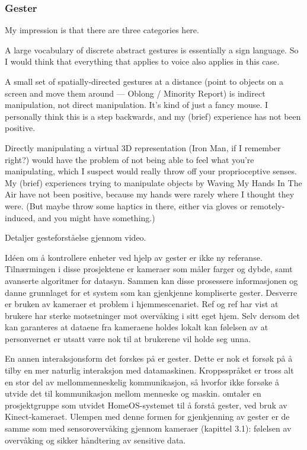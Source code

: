\subsubsection*{Gester}
{\color{blue}
My impression is that there are three categories here.

A large vocabulary of discrete abstract gestures is essentially a sign language. So I would think that everything that applies to voice also applies in this case.

A small set of spatially-directed gestures at a distance (point to objects on a screen and move them around — Oblong / Minority Report) is indirect manipulation, not direct manipulation. It's kind of just a fancy mouse. I personally think this is a step backwards, and my (brief) experience has not been positive.

Directly manipulating a virtual 3D representation (Iron Man, if I remember right?) would have the problem of not being able to feel what you're manipulating, which I suspect would really throw off your proprioceptive senses. My (brief) experiences trying to manipulate objects by Waving My Hands In The Air have not been positive, because my hands were rarely where I thought they were. (But maybe throw some haptics in there, either via gloves or remotely-induced, and you might have something.)

Detaljer gesteforståelse gjennom video.

Idéen om å kontrollere enheter ved hjelp av gester er ikke ny {\color{red} referanse}. Tilnærmingen i disse prosjektene er kameraer som måler farger og dybde, samt avanserte algoritmer for datasyn. Sammen kan disse prosessere informasjonen og danne grunnlaget for et system som kan gjenkjenne kompliserte gester. Desverre er bruken av kameraer et problem i hjemmescenariet. {\color{red} Ref og ref} har vist at brukere har sterke motsetninger mot overvåking i sitt eget hjem. Selv dersom det kan garanteres at dataene fra kameraene holdes lokalt kan følelsen av at personvernet er utsatt være nok til at brukerene vil holde seg unna. 

En annen interaksjonsform det forskes på er gester. Dette er nok et forsøk på å tilby en mer naturlig interaksjon med datamaskinen. Kroppsspråket er tross alt en stor del av mellommenneskelig kommunikasjon, så hvorfor ikke forsøke å utvide det til kommunikasjon mellom menneske og maskin. \citet{homeos} omtaler en prosjektgruppe som utvidet HomeOS-systemet til å forstå gester, ved bruk av Kinect-kameraet. Ulempen med denne formen for gjenkjenning av gester er de samme som med sensorovervåking gjennom kameraer (kapittel 3.1): følelsen av overvåking og sikker håndtering av sensitive data.

}
